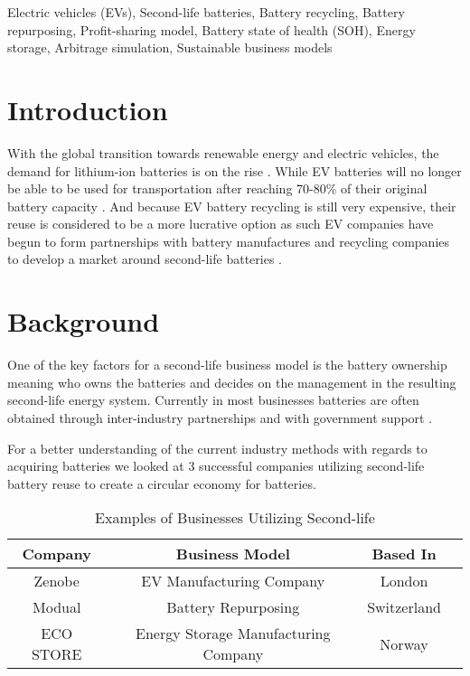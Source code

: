 \documentclass[conference]{IEEEtran}
\begin{document}
\begin{IEEEkeywords}
Electric vehicles (EVs), Second-life batteries, Battery recycling, Battery repurposing,
Profit-sharing model, Battery state of health (SOH), Energy storage, Arbitrage simulation,
Sustainable business models
\end{IEEEkeywords}

\section{Introduction}

With the global transition towards renewable energy and electric vehicles, the demand for lithium-ion batteries is on the rise \cite{b1}. While EV batteries will no longer be able to be used for transportation after reaching 70-80\% of their original battery capacity \cite{b2}. And because EV battery recycling is still very expensive, their reuse is considered to be a more lucrative option as such EV companies have begun to form partnerships with battery manufactures and recycling companies to develop a market around second-life batteries \cite{b3}.

\section{Background}

One of the key factors for a second-life business model is the battery ownership meaning who owns the batteries and decides on the management in the resulting second-life energy system. Currently in most businesses batteries are often obtained through inter-industry partnerships and with government support \cite{b4}.

For a better understanding of the current industry methods with regards to acquiring batteries we looked at 3 successful companies utilizing second-life battery reuse to create a circular economy for batteries.

\begin{table}[htbp]
\caption{Examples of Businesses Utilizing  Second-life}
\begin{center}
\begin{tabular}{|c|c|c|c|}
\hline
\textbf{Company} & \textbf{Business Model} & \textbf{Based In} \\ \hline
Zenobe & EV Manufacturing Company & London \\ \hline
Modual & Battery Repurposing & Switzerland \\ \hline
ECO STORE & Energy Storage Manufacturing Company & Norway \\ \hline
\end{tabular}
\end{center}
\end{table}
\end{document}
